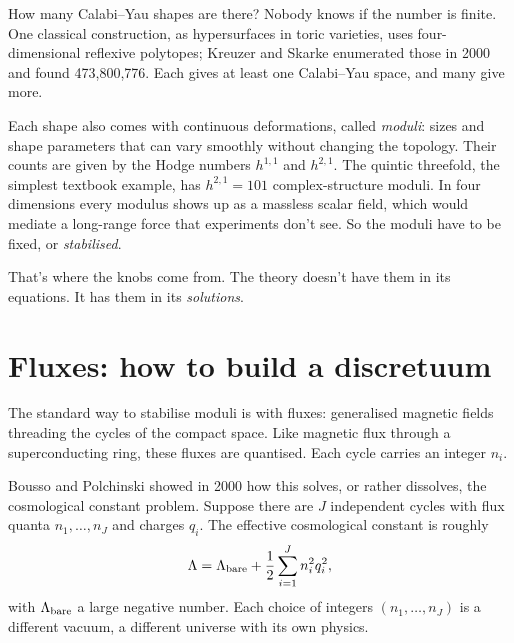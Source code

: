 


How many Calabi--Yau shapes are there? Nobody knows if the number is finite. One classical construction, as hypersurfaces in toric varieties, uses four-dimensional reflexive polytopes; Kreuzer and Skarke enumerated those in 2000 and found 473,800,776. Each gives at least one Calabi--Yau space, and many give more.




Each shape also comes with continuous deformations, called \emph{moduli}: sizes and shape parameters that can vary smoothly without changing the topology. Their counts are given by the Hodge numbers $h^{1,1}$ and $h^{2,1}$. The quintic threefold, the simplest textbook example, has $h^{2,1}=101$ complex-structure moduli. In four dimensions every modulus shows up as a massless scalar field, which would mediate a long-range force that experiments don't see. So the moduli have to be fixed, or \emph{stabilised}.

That's where the knobs come from. The theory doesn't have them in its equations. It has them in its \emph{solutions}.

\section{Fluxes: how to build a discretuum}

The standard way to stabilise moduli is with fluxes: generalised magnetic fields threading the cycles of the compact space. Like magnetic flux through a superconducting ring, these fluxes are quantised. Each cycle carries an integer $n_i$.

Bousso and Polchinski showed in 2000 how this solves, or rather dissolves, the cosmological constant problem. Suppose there are $J$ independent cycles with flux quanta $n_1,\dots,n_J$ and charges $q_i$. The effective cosmological constant is roughly
\begin{equation}
\Lambda=\Lambda_{\rm bare}+\frac12\sum_{i=1}^{J}n_i^2q_i^2,
\end{equation}
with $\Lambda_{\rm bare}$ a large negative number. Each choice of integers $(n_1,\dots,n_J)$ is a different vacuum, a different universe with its own physics.

